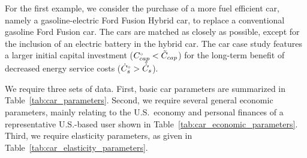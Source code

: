 \documentclass[12pt]{article}\usepackage[]{graphicx}\usepackage[]{xcolor}
\begin{document}
For the first example,
we consider the purchase of a more fuel efficient car,
namely a gasoline-electric Ford Fusion Hybrid car,
to replace a conventional gasoline Ford Fusion car.
The cars are matched as closely as possible,
except for the inclusion of an electric battery
in the hybrid car.
The car case study features a larger initial capital investment (${}{C}^{\scriptscriptstyle \circ}_{cap} < \tilde{C}_{cap}$)
for the long-term benefit of decreased energy service costs (${}{\dot{C}}^{\scriptscriptstyle \circ}_s > \tilde{\dot{C}}_s$).

We require three sets of data.
First, basic car parameters are summarized
in Table~\ref{tab:car_parameters}.
Second, we require several general economic parameters,
mainly relating to the U.S.\ economy and personal finances
of a representative U.S.-based user
shown in Table~\ref{tab:car_economic_parameters}.
Third, we require elasticity parameters,
as given in Table~\ref{tab:car_elasticity_parameters}.



\renewcommand{\arraystretch}{0.6}
\end{document}
